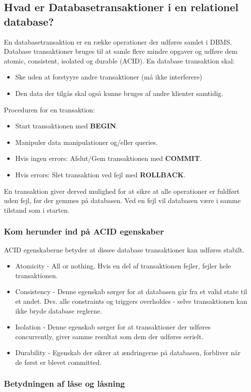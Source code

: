 \newpage

\subsection{Hvad er Databasetransaktioner i en relationel database?}
En databasetransaktion er en række operationer der udføres samlet i DBMS. Database transaktioner bruges til at samle flere mindre opgaver og udføre dem atomic, consistent, isolated og durable (ACID). En database transaktion skal:

\begin{itemize}
	\item Ske uden at forstyyre andre transaktioner (må ikke interferere)
	\item Den data der tilgås skal også kunne bruges af andre klienter samtidig.
\end{itemize}

Proceduren for en transaktion:

\begin{itemize}
	\item Start transaktionen med \textbf{BEGIN}.
	\item Manipuler data manipulationer og/eller queries.
	\item Hvis ingen errors: Afslut/Gem transaktionen med \textbf{COMMIT}.
	\item Hvis errors: Slet transaktion ved fejl med \textbf{ROLLBACK}.
\end{itemize}

En transaktion giver derved mulighed for at sikre at alle operationer er fuldført uden fejl, før der gemmes på databasen. Ved en fejl vil databasen være i samme tilstand som i starten.
\subsubsection{Kom herunder ind på ACID egenskaber}
ACID egenskaberne betyder at dissee database transaktioner kan udføres stabilt.

\begin{itemize}
	\item Atomicity - All or nothing. Hvis en del af transaktionen fejler, fejler hele transaktionen.
	\item Consistency - Denne egenskab sørger for at databasen går fra et valid state til et andet. Dvs. alle constraints og triggers overholdes - selve transaktionen kan ikke bryde database reglerne.
	\item Isolation - Denne egenskab sørger for at transaktioner der udføres concurrently, giver samme resultat som dem der udføres serielt.
	\item Durability - Egenskab der sikrer at ændringerne på databasen, forbliver når de først er blevet committed.
\end{itemize}
\subsubsection{Betydningen af låse og låsning}